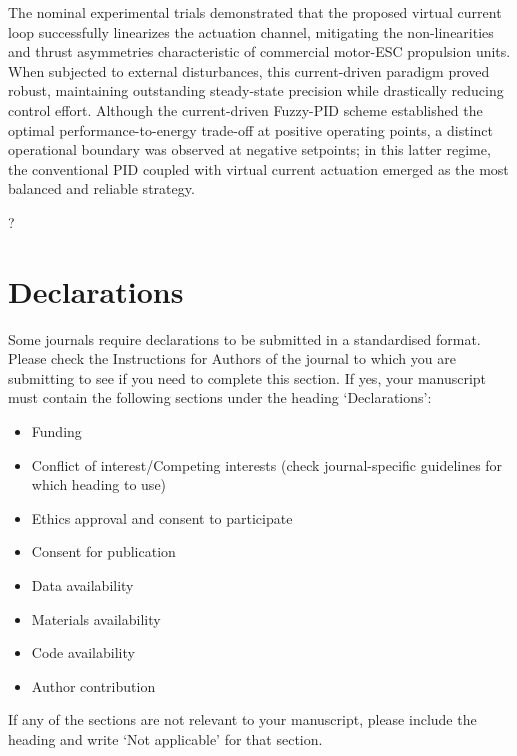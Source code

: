 \documentclass[pdflatex,sn-mathphys-num,iicol]{sn-jnl}
\theoremstyle{thmstyleone}%
\theoremstyle{thmstyletwo}%
\theoremstyle{thmstylethree}%
\begin{document}
The nominal experimental trials demonstrated that the proposed virtual current loop successfully linearizes the actuation channel, mitigating the non-linearities and thrust asymmetries characteristic of commercial motor-ESC propulsion units. When subjected to external disturbances, this current-driven paradigm proved robust, maintaining outstanding steady-state precision while drastically reducing control effort. Although the current-driven Fuzzy-PID scheme established the optimal performance-to-energy trade-off at positive operating points, a distinct operational boundary was observed at negative setpoints; in this latter regime, the conventional PID coupled with virtual current actuation emerged as the most balanced and reliable strategy.


\backmatter




?

\section*{Declarations}

Some journals require declarations to be submitted in a standardised format. Please check the Instructions for Authors of the journal to which you are submitting to see if you need to complete this section. If yes, your manuscript must contain the following sections under the heading `Declarations':

\begin{itemize}
\item Funding
\item Conflict of interest/Competing interests (check journal-specific guidelines for which heading to use)
\item Ethics approval and consent to participate
\item Consent for publication
\item Data availability 
\item Materials availability
\item Code availability 
\item Author contribution
\end{itemize}

\noindent
If any of the sections are not relevant to your manuscript, please include the heading and write `Not applicable' for that section. 
\end{document}
